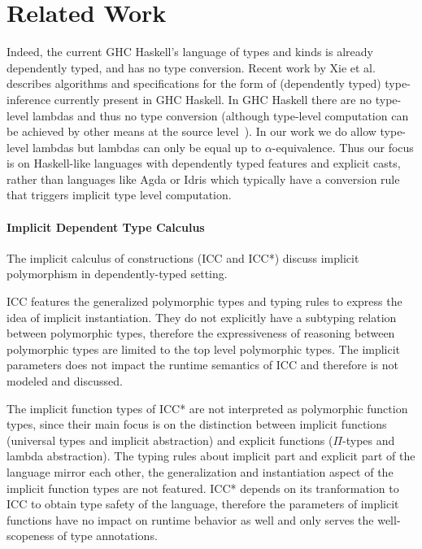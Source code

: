 \section{Related Work}

Indeed, the current GHC Haskell's language of types and kinds
is already dependently typed, and has no type conversion. Recent work by
Xie et al.~\cite{xie20kind} describes algorithms and specifications
for the form of (dependently typed) type-inference currently present in GHC Haskell.
In GHC Haskell there are no type-level lambdas and thus no type conversion
(although type-level computation can be achieved by other means at the source
level~\cite{Chakravarty05associated}). In our work we do allow type-level lambdas
but lambdas can only be equal up to $\alpha$-equivalence.
Thus our focus is on Haskell-like languages with dependently typed
features and explicit casts, rather than languages like Agda or Idris
which typically have a conversion rule that triggers implicit type level
computation.

\paragraph{Implicit Dependent Type Calculus}

The implicit calculus of constructions (ICC\cite{miquel2001implicit} and
ICC*\cite{barras2008implicit}) discuss implicit polymorphism in dependently-typed
setting.

ICC features the generalized polymorphic types and typing rules to express
the idea of implicit instantiation. They do not explicitly have a subtyping
relation between polymorphic types, therefore the expressiveness of reasoning
between polymorphic types are limited to the top level polymorphic types. The
implicit parameters does not impact the runtime semantics of ICC and therefore
is not modeled and discussed.

The implicit function types of ICC* are not interpreted as polymorphic
function types, since their main focus is on the distinction between implicit
functions (universal types and implicit abstraction) and explicit functions
($\Pi$-types and lambda abstraction).
The typing rules about implicit part and explicit part of the language mirror
each other, the generalization and instantiation aspect of the implicit function
types are not featured. ICC* depends on its tranformation to ICC to obtain type safety
of the language, therefore the parameters of implicit functions have no impact
on runtime behavior as well and only serves the well-scopeness of type annotations.

